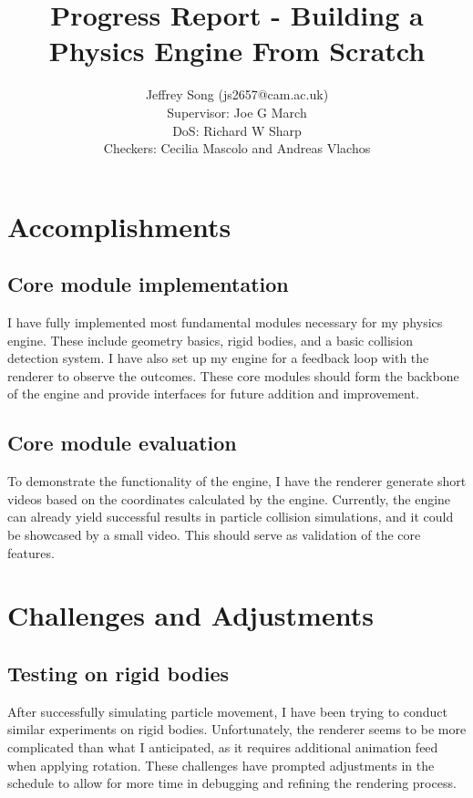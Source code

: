 \documentclass[12pt]{article}
\title{Progress Report - Building a Physics Engine From Scratch}
\date{Jeffrey Song (js2657@cam.ac.uk) \\ Supervisor: Joe G March \\ DoS: Richard W Sharp \\ Checkers: Cecilia Mascolo and Andreas Vlachos}
\begin{document}
\maketitle

\section*{Accomplishments}

\subsection*{Core module implementation}

I have fully implemented most fundamental modules necessary for my physics engine. These include geometry basics, rigid bodies, and a basic collision detection system. I have also set up my engine for a feedback loop with the renderer to observe the outcomes. These core modules should form the backbone of the engine and provide interfaces for future addition and improvement.

\subsection*{Core module evaluation}

To demonstrate the functionality of the engine, I have the renderer generate short videos based on the coordinates calculated by the engine. Currently, the engine can already yield successful results in particle collision simulations, and it could be showcased by a small video. This should serve as validation of the core features.

\section*{Challenges and Adjustments}

\subsection*{Testing on rigid bodies}

After successfully simulating particle movement, I have been trying to conduct similar experiments on rigid bodies. Unfortunately, the renderer seems to be more complicated than what I anticipated, as it requires additional animation feed when applying rotation. These challenges have prompted adjustments in the schedule to allow for more time in debugging and refining the rendering process.
\end{document}
